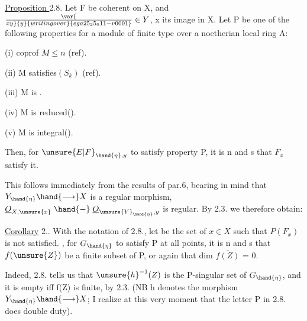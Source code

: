 
\uline{Proposition }2.8. Let F be coherent on X, and  $\var{\over{x}{y}}{y}{writing over}{ega25_25_011-v0001}\in Y$, x its image
in X.  Let P be one of the following properties for
a module of finite type  over a noetherian local ring A:

(i) coprof $M\leqslant n$ (ref).

(ii) M satisfies$(S_k)$ (ref).

(iii) M is .

(iv) M is reduced().

(v) M is integral().

Then, for $\unsure{E|F}_{\hand{\eta},y}$ to satisfy property P, it is n and s that $F_x$
satisfy it.

This follows immediately from the results of par.6, bearing in mind that
 $Y_{\hand{\eta}}\hand{\longrightarrow} X$ is a regular morphism,  $\underline{O}_{X,\unsure{x}}\mathrel{\hand{-}} \underline{O}_{\unsure{Y}_{\hand{\eta}},y}$ is
regular. By 2.3. we therefore obtain:

\uline{Corollary} 2.. With the notation of 2.8., let  be the set
of $x\in X$ such that $P(F_x)$ is not satisfied. , for
$G_{\hand{\eta}}$ to satisfy P at all points, it is n and s that $f(\unsure{Z})$ be a
finite subset of P, or again that  dim $\overline{f(Z)}$ = 0.

Indeed, 2.8. tells us that $\unsure{h}^{-1}(Z)$ is the P-singular set
of $G_{\hand{\eta}}$, and it is empty iff f(Z) is finite, by 2.3. (NB h denotes
 the morphism $Y_{\hand{\eta}}\hand{\longrightarrow} X$; I realize at this very moment that the letter P
 in 2.8. does double duty).

